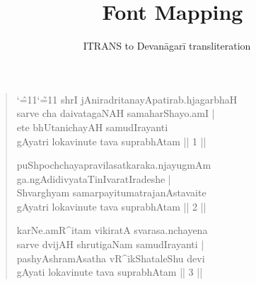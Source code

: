 \documentclass[a4paper,oneside,12pt]{article}
\title{\XeTeX\ Font Mapping}
\author{ITRANS to Devanāgarī transliteration}
\date{\relax}
\newcommand\sa{\catcode`\^=11\catcode`\~=11%
              \fontspec[Script=Devanagari,Mapping=itrans-dn,Scale=MatchLowercase]{Shobhika}}
\begin{document}
\maketitle
\thispagestyle{empty}
\bigskip

\begin{verse}
  {\sa shrI jAniradritanayApatirab.hjagarbhaH\\
    sarve cha daivatagaNAH samaharShayo.amI |\\
    ete bhUtanichayAH samudIrayanti\\
    gAyatri \- lokavinute tava suprabhAtam || 1 ||

    puShpochchayapravilasatkaraka.njayugmAm\\
    ga.ngAdidivyataTinIvaratIradeshe\- |\\
    Shvarghyam samarpayitumatrajanAstavaite\\
    gAyatri \- lokavinute \- tava suprabhAtam || 2 ||

    karNe.amR^itam vikiratA svarasa.nchayena\\
    sarve dvijAH shrutigaNam samudIrayanti |\\
    pashyAshramAsatha vR^ikShataleShu devi\\
    gAyati \-lokavinute \-tava suprabhAtam || 3 ||
  }
\end{verse}
\end{document}
